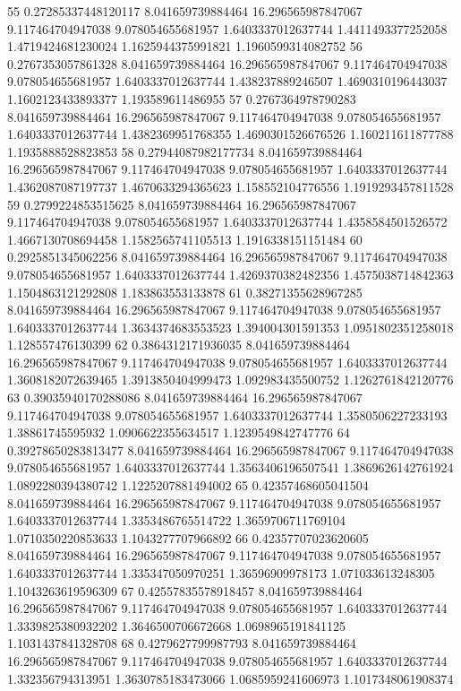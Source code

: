 {55 0.27285337448120117 8.041659739884464 16.296565987847067 9.117464704947038 9.078054655681957 1.6403337012637744 1.4411493377252058 1.4719424681230024 1.1625944375991821 1.1960599314082752
56 0.2767353057861328 8.041659739884464 16.296565987847067 9.117464704947038 9.078054655681957 1.6403337012637744 1.438237889246507 1.4690310196443037 1.1602123433893377 1.193589611486955
57 0.2767364978790283 8.041659739884464 16.296565987847067 9.117464704947038 9.078054655681957 1.6403337012637744 1.4382369951768355 1.4690301526676526 1.160211611877788 1.1935888528823853
58 0.27944087982177734 8.041659739884464 16.296565987847067 9.117464704947038 9.078054655681957 1.6403337012637744 1.4362087087197737 1.4670633294365623 1.158552104776556 1.1919293457811528
59 0.2799224853515625 8.041659739884464 16.296565987847067 9.117464704947038 9.078054655681957 1.6403337012637744 1.4358584501526572 1.4667130708694458 1.1582565741105513 1.1916338151151484
60 0.2925851345062256 8.041659739884464 16.296565987847067 9.117464704947038 9.078054655681957 1.6403337012637744 1.4269370382482356 1.4575038714842363 1.1504863121292808 1.183863553133878
61 0.38271355628967285 8.041659739884464 16.296565987847067 9.117464704947038 9.078054655681957 1.6403337012637744 1.3634374683553523 1.394004301591353 1.0951802351258018 1.128557476130399
62 0.3864312171936035 8.041659739884464 16.296565987847067 9.117464704947038 9.078054655681957 1.6403337012637744 1.3608182072639465 1.3913850404999473 1.092983435500752 1.1262761842120776
63 0.39035940170288086 8.041659739884464 16.296565987847067 9.117464704947038 9.078054655681957 1.6403337012637744 1.3580506227233193 1.38861745595932 1.0906622355634517 1.1239549842747776
64 0.39278650283813477 8.041659739884464 16.296565987847067 9.117464704947038 9.078054655681957 1.6403337012637744 1.3563406196507541 1.3869626142761924 1.0892280394380742 1.1225207881494002
65 0.42357468605041504 8.041659739884464 16.296565987847067 9.117464704947038 9.078054655681957 1.6403337012637744 1.3353486765514722 1.3659706711769104 1.0710350220853633 1.1043277707966892
66 0.42357707023620605 8.041659739884464 16.296565987847067 9.117464704947038 9.078054655681957 1.6403337012637744 1.335347050970251 1.36596909978173 1.071033613248305 1.1043263619596309
67 0.42557835578918457 8.041659739884464 16.296565987847067 9.117464704947038 9.078054655681957 1.6403337012637744 1.3339825380932202 1.3646500706672668 1.0698965191841125 1.1031437841328708
68 0.4279627799987793 8.041659739884464 16.296565987847067 9.117464704947038 9.078054655681957 1.6403337012637744 1.332356794313951 1.3630785183473066 1.0685959241606973 1.1017348061908374
}
